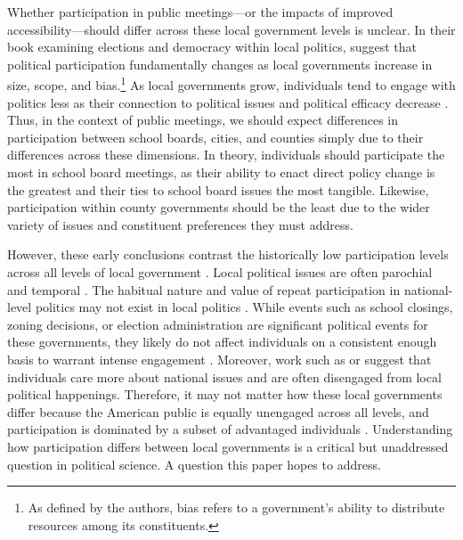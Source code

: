     Whether participation in public meetings—or the impacts of improved accessibility—should differ across these local government levels is unclear. In their book examining elections and democracy within local politics, \citet{oliverLocalElectionsPolitics2012} suggest that political participation fundamentally changes as local governments increase in size, scope, and bias.\footnote{As defined by the authors, bias refers to a government's ability to distribute resources among its constituents.} As local governments grow, individuals tend to engage with politics less as their connection to political issues and political efficacy decrease \citep{oliverDemocracySuburbia2001,schlozmanUnheavenlyChorusUnequal2012}. Thus, in the context of public meetings, we should expect differences in participation between school boards, cities, and counties simply due to their differences across these dimensions. In theory, individuals should participate the most in school board meetings, as their ability to enact direct policy change is the greatest and their ties to school board issues the most tangible. Likewise, participation within county governments should be the least due to the wider variety of issues and constituent preferences they must address.

    However, these early conclusions contrast the historically low participation levels across all levels of local government \citep{hopkinsIncreasinglyUnitedStates2018}. Local political issues are often parochial and temporal \citep{oliverLocalElectionsPolitics2012}. The habitual nature and value of repeat participation in national-level politics may not exist in local politics \citep{aldrichTurnoutHabit2011}. While events such as school closings, zoning decisions, or election administration are significant political events for these governments, they likely do not affect individuals on a consistent enough basis to warrant intense engagement \citep[see][]{nuamahCloseHomePlaceBased2021}. Moreover, work such as \citet{hopkinsIncreasinglyUnitedStates2018} or \citet{hershPoliticsPowerHow2020} suggest that individuals care more about national issues and are often disengaged from local political happenings. Therefore, it may not matter how these local governments differ because the American public is equally unengaged across all levels, and participation is dominated by a subset of advantaged individuals \citep[e.g.,][]{einsteinWhoParticipatesLocal2019,yoderDoesPropertyOwnership2020}. Understanding how participation differs between local governments is a critical but unaddressed question in political science. A question this paper hopes to address.

